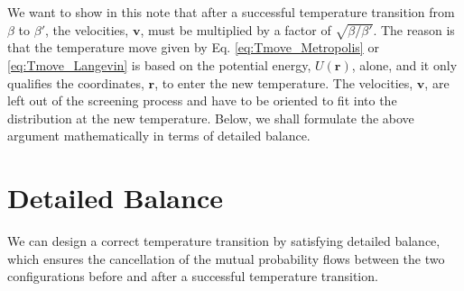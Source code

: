 \documentclass[11pt]{article}
\begin{document}
We want to show in this note that after a successful
temperature transition from $\beta$ to $\beta'$,
the velocities, $\mathbf v$, must be multiplied by
a factor of $\sqrt{ \beta / \beta' }$.
%
The reason is that the temperature move
given by Eq. \eqref{eq:Tmove_Metropolis}
or \eqref{eq:Tmove_Langevin}
is based on the potential energy, $U(\mathbf r)$, alone,
%
and it only qualifies the coordinates, $\mathbf r$,
to enter the new temperature.
%
The velocities, $\mathbf v$, are left out of
the screening process
and have to be oriented to fit into
the distribution at the new temperature.
%
Below, we shall formulate the above argument
mathematically in terms of detailed balance.


\section{Detailed Balance}


We can design a correct temperature transition
by satisfying detailed balance,
which ensures the cancellation
of the mutual probability flows between
the two configurations before and after
a successful temperature transition.
\end{document}
